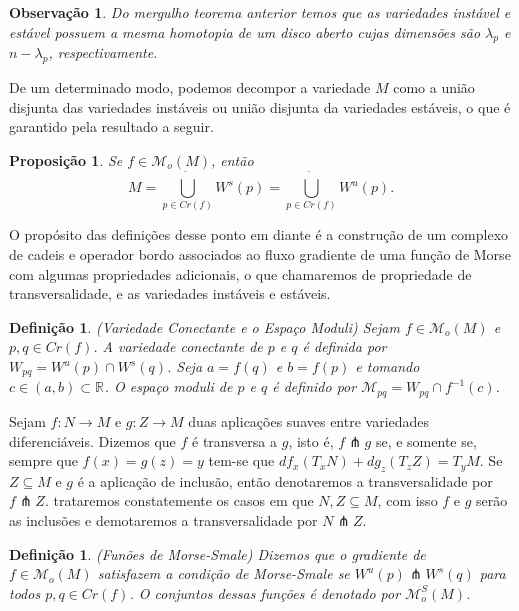 \documentclass[12pt]{book}
\newtheorem{definicao}[teorema]{Definição}
\newtheorem{observacao}[teorema]{Observação}
\newtheorem{proposicao}[teorema]{Proposição}
\newcommand{\espacomoduli}[2]{\mathcal{M}_{#1#2}}
\newcommand{\espacotangenteponto}[2]{T_{#1}#2}
\newcommand{\funcoesmorse}[1]{\mathcal{M}_{o}(#1)}
\newcommand{\funcoesmorsesmale}[1]{\mathcal{M}^{S}_{o}(#1)}
\newcommand{\pontoscriticos}[1]{\textit{Cr}(#1)}
\newcommand{\real}[1]{\mathbb{R}^{#1}}
\newcommand{\reta}{\real{}}
\newcommand{\variedadeconectantepontos}[2]{W_{#1#2}}
\newcommand{\variedadeestavel}[1]{W^{s}(#1)}
\newcommand{\variedadeinstavel}[1]{W^{u}(#1)}
\begin{document}
	\begin{observacao}
		Do mergulho teorema anterior temos que as variedades instável e estável possuem a mesma homotopia de um disco aberto cujas dimensões são $\lambda_{p}$ e $n-\lambda_{p}$, respectivamente.
	\end{observacao}

	De um determinado modo, podemos decompor a variedade $M$ como a união disjunta das variedades instáveis ou união disjunta da variedades estáveis, o que é garantido pela resultado a seguir.
	
	\begin{proposicao}
		Se $f \in \funcoesmorse{M}$, então
		$$
		M = \dot{\bigcup_{p \in \pontoscriticos{f}}}\variedadeestavel{p} = \dot{\bigcup_{p \in \pontoscriticos{f}}}\variedadeinstavel{p}.
		$$
	\end{proposicao}

	 O propósito das definições desse ponto em diante é a construção de um complexo de cadeis e operador bordo associados ao fluxo gradiente de uma função de Morse com algumas propriedades adicionais, o que chamaremos de propriedade de transversalidade, e as variedades instáveis e estáveis.
	 
	 \begin{definicao}
	 	(Variedade Conectante e o Espaço Moduli) Sejam $f \in \funcoesmorse{M}$ e $p,q \in \pontoscriticos{f}$. A variedade conectante de $p$ e $q$ é definida por $\variedadeconectantepontos{p}{q} = \variedadeinstavel{p}\cap \variedadeestavel{q}$. Seja $a = f(q)$ e $b = f(p)$ e tomando $c \in (a, b) \subset \reta$. O espaço moduli de $p$ e $q$ é definido por $\espacomoduli{p}{q} = \variedadeconectantepontos{p}{q}\cap f^{-1}(c)$.
	 \end{definicao}
	 
	 Sejam $f: N\to M$ e $g: Z \to M$ duas aplicações suaves entre variedades diferenciáveis. Dizemos que $f$ é transversa a $g$, isto é, $f \pitchfork g$ se, e somente se, sempre que $f(x) = g(z) = y$ tem-se que $df_{x}(\espacotangenteponto{x}{N}) + dg_{z}(\espacotangenteponto{z}{Z}) = \espacotangenteponto{y}{M} $. Se $Z \subseteq M$ e $g$ é a aplicação de inclusão, então denotaremos a transversalidade por $f\pitchfork Z$. trataremos constatemente os casos em que $N, Z \subseteq M$, com isso $f$ e $g$ serão as inclusões e demotaremos a transversalidade por $N \pitchfork Z$.
	 
	 \begin{definicao}
	 	(Funões de Morse-Smale) Dizemos que o gradiente de $f \in \funcoesmorse{M}$ satisfazem a condição de Morse-Smale se $\variedadeinstavel{p}\pitchfork \variedadeestavel{q}$ para todos $p,q \in \pontoscriticos{f}$. O conjuntos dessas funções é denotado por $\funcoesmorsesmale{M}$.
	 \end{definicao}
	 
\end{document}
